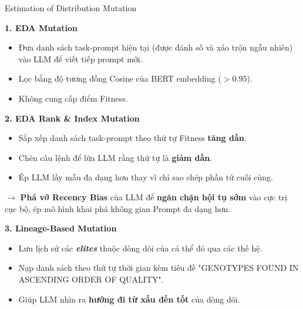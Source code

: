 \documentclass[english,main=vietnamese,xcolor=table]{beamer}
\begin{document}
\begin{frame}{Estimation of Distribution Mutation}

\textbf{1. EDA Mutation}
\begin{itemize}
    \item Đưa danh sách task-prompt hiện tại (được đánh số và xáo trộn ngẫu nhiên) vào LLM để viết tiếp prompt mới.
    \item Lọc bằng độ tương đồng Cosine của BERT embedding ($>0.95$).
    \item Không cung cấp điểm Fitness.
\end{itemize}

\vspace{0.2em}

\textbf{2. EDA Rank \& Index Mutation}
\begin{itemize}
    \item Sắp xếp danh sách task-prompt theo thứ tự Fitness \textbf{tăng dần}.
    \item Chèn câu lệnh để lừa LLM rằng thứ tự là \textbf{giảm dần}.
    \item Ép LLM lấy mẫu đa dạng hơn thay vì chỉ sao chép phần tử cuối cùng.
\end{itemize}
$\rightarrow$ \textbf{Phá vỡ Recency Bias} của LLM để \textbf{ngăn chặn hội tụ sớm} vào cực trị cục bộ, ép mô hình khai phá không gian Prompt đa dạng hơn.
\vspace{0.2em}

\textbf{3. Lineage-Based Mutation}
\begin{itemize}
    \item Lưu lịch sử các \textbf{\textit{elites}} thuộc dòng dõi của cá thể đó qua các thế hệ.
    \item Nạp danh sách theo thứ tự thời gian kèm tiêu đề "GENOTYPES FOUND IN ASCENDING ORDER OF QUALITY".
    \item Giúp LLM nhìn ra \textbf{hướng đi từ xấu đến tốt} của dòng dõi.
\end{itemize}

\end{frame}

\end{document}
